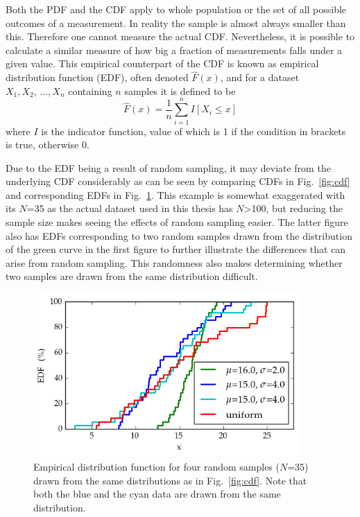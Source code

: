 \documentclass[english, oneside]{HYgradu}
\begin{document}
Both the PDF and the CDF apply to whole population or the set of all possible outcomes of a measurement. In reality the sample is almost always smaller than this. Therefore one cannot measure the actual CDF. Nevertheless, it is possible to calculate a similar measure of how big a fraction of measurements falls under a given value. This empirical counterpart of the CDF is known as empirical distribution function (EDF), often denoted $\hat F(x)$, and for a dataset $X_1, X_2,\,..., X_n$ containing $n$ samples it is defined to be
\begin{equation}
	\hat F(x) = \frac{1}{n}\sum_{i=1}^n I[X_i \leq x]
\end{equation}
where $I$ is the indicator function, value of which is 1 if the condition in brackets is true, otherwise 0. \citep{feigelson2012modern}

Due to the EDF being a result of random sampling, it may deviate from the underlying CDF considerably as can be seen by comparing CDFs in Fig.\ \ref{fig:cdf} and corresponding EDFs in Fig.\ \ref{fig:edf}. This example is somewhat exaggerated with its $N$=35 as the actual dataset used in this thesis has $N$>100, but reducing the sample size makes seeing the effects of random sampling easier. The latter figure also has EDFs corresponding to two random samples drawn from the distribution of the green curve in the first figure to further illustrate the differences that can arise from random sampling. This randomness also makes determining whether two samples are drawn from the same distribution difficult.

\begin{figure}
   \centering
   \includegraphics[width=0.9\textwidth]{kuvat/edf.png}
   \caption{Empirical distribution function for four random samples ($N$=35) drawn from the same distributions as in Fig.\ \ref{fig:cdf}. Note that both the blue and the cyan data are drawn from the same distribution.}
   \label{fig:edf}
\end{figure}
\end{document}
